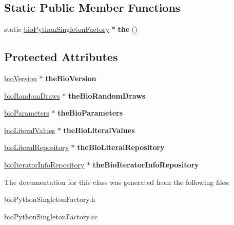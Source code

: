 \subsection*{Static Public Member Functions}
\begin{DoxyCompactItemize}
\item 
\mbox{\label{classbio_python_singleton_factory_a51e415c51330545aec40752ba7286e87}} 
static \hyperlink{classbio_python_singleton_factory}{bio\+Python\+Singleton\+Factory} $\ast$ {\bfseries the} ()
\end{DoxyCompactItemize}
\subsection*{Protected Attributes}
\begin{DoxyCompactItemize}
\item 
\mbox{\label{classbio_python_singleton_factory_ae2eb5d849ef207d4d34bb82590e1970b}} 
\hyperlink{classbio_version}{bio\+Version} $\ast$ {\bfseries the\+Bio\+Version}
\item 
\mbox{\label{classbio_python_singleton_factory_a60e1b7f03ce2b056548872280661a2aa}} 
\hyperlink{classbio_random_draws}{bio\+Random\+Draws} $\ast$ {\bfseries the\+Bio\+Random\+Draws}
\item 
\mbox{\label{classbio_python_singleton_factory_a8e684a256d001be41dd67d6caca60938}} 
\hyperlink{classbio_parameters}{bio\+Parameters} $\ast$ {\bfseries the\+Bio\+Parameters}
\item 
\mbox{\label{classbio_python_singleton_factory_a0ae77df32bfb27b91660875c444935ea}} 
\hyperlink{classbio_literal_values}{bio\+Literal\+Values} $\ast$ {\bfseries the\+Bio\+Literal\+Values}
\item 
\mbox{\label{classbio_python_singleton_factory_ac5a8d4effa6c1c13c3d3076a022a2974}} 
\hyperlink{classbio_literal_repository}{bio\+Literal\+Repository} $\ast$ {\bfseries the\+Bio\+Literal\+Repository}
\item 
\mbox{\label{classbio_python_singleton_factory_a2c47d22e311bcc5672fec0b3e6d98745}} 
\hyperlink{classbio_iterator_info_repository}{bio\+Iterator\+Info\+Repository} $\ast$ {\bfseries the\+Bio\+Iterator\+Info\+Repository}
\end{DoxyCompactItemize}


The documentation for this class was generated from the following files\+:\begin{DoxyCompactItemize}
\item 
bio\+Python\+Singleton\+Factory.\+h\item 
bio\+Python\+Singleton\+Factory.\+cc\end{DoxyCompactItemize}
